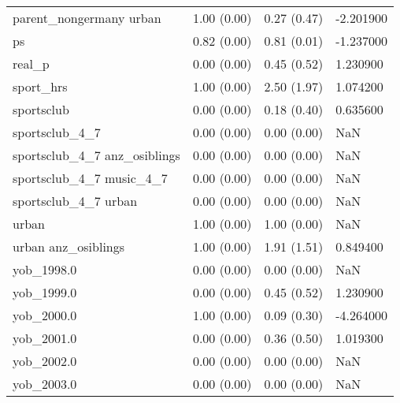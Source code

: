 \begin{tabular}{llll}
parent\_nongermany urban & 1.00 (0.00) & 0.27 (0.47) & -2.201900 \\
ps & 0.82 (0.00) & 0.81 (0.01) & -1.237000 \\
real\_p & 0.00 (0.00) & 0.45 (0.52) & 1.230900 \\
sport\_hrs & 1.00 (0.00) & 2.50 (1.97) & 1.074200 \\
sportsclub & 0.00 (0.00) & 0.18 (0.40) & 0.635600 \\
sportsclub\_4\_7 & 0.00 (0.00) & 0.00 (0.00) & NaN \\
sportsclub\_4\_7 anz\_osiblings & 0.00 (0.00) & 0.00 (0.00) & NaN \\
sportsclub\_4\_7 music\_4\_7 & 0.00 (0.00) & 0.00 (0.00) & NaN \\
sportsclub\_4\_7 urban & 0.00 (0.00) & 0.00 (0.00) & NaN \\
urban & 1.00 (0.00) & 1.00 (0.00) & NaN \\
urban anz\_osiblings & 1.00 (0.00) & 1.91 (1.51) & 0.849400 \\
yob\_1998.0 & 0.00 (0.00) & 0.00 (0.00) & NaN \\
yob\_1999.0 & 0.00 (0.00) & 0.45 (0.52) & 1.230900 \\
yob\_2000.0 & 1.00 (0.00) & 0.09 (0.30) & -4.264000 \\
yob\_2001.0 & 0.00 (0.00) & 0.36 (0.50) & 1.019300 \\
yob\_2002.0 & 0.00 (0.00) & 0.00 (0.00) & NaN \\
yob\_2003.0 & 0.00 (0.00) & 0.00 (0.00) & NaN \\
\bottomrule
\end{tabular}
